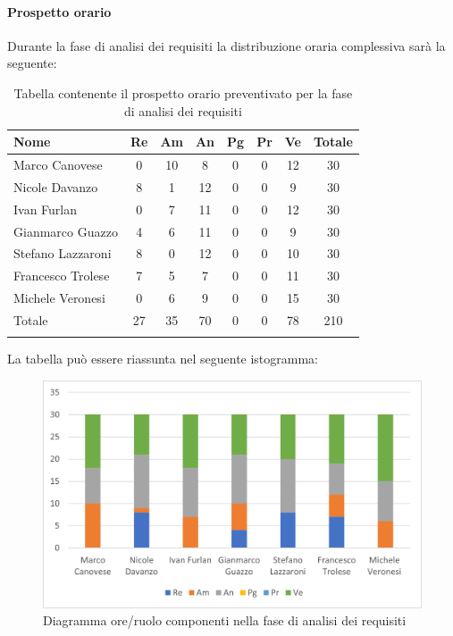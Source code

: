 		\paragraph{Prospetto orario}
			Durante la fase di analisi dei requisiti la distribuzione oraria complessiva sarà la seguente:
			
			\begin{longtable}{|l|c|c|c|c|c|c|c|}
				\hline
				\rowcolor{lighter-grayer}
				\textbf{Nome} & \textbf{Re} & \textbf{Am} & \textbf{An} & \textbf{Pg}  & \textbf{Pr}   & \textbf{Ve} & \textbf{Totale} \\
				\hline
				\endfirsthead
				
				\hline
				Marco Canovese & 0 & 10 & 8 & 0 & 0 & 12 & 30\\
				\hline
				\hline
				Nicole Davanzo & 8 & 1 & 12 & 0 & 0 & 9 & 30\\
				\hline
				\hline
				Ivan Furlan & 0 & 7 & 11 & 0 & 0 & 12 & 30\\
				\hline
				\hline
				Gianmarco Guazzo & 4 & 6 & 11 & 0 & 0 & 9 & 30\\
				\hline
				\hline
				Stefano Lazzaroni & 8 & 0 & 12 & 0 & 0 & 10 & 30\\
				\hline
				\hline
				Francesco Trolese & 7 & 5 & 7 & 0 & 0 & 11 & 30\\
				\hline
				\hline
				Michele Veronesi & 0 & 6 & 9 & 0 & 0 & 15 & 30\\
				\hline 
				\hline
				Totale & 27 & 35 & 70 & 0 & 0 & 78 & 210\\
				\hline
				\rowcolor{white} 
				\caption{Tabella contenente il prospetto orario preventivato per la fase di analisi dei requisiti}
			\end{longtable}

		
			La tabella può essere riassunta nel seguente istogramma:
		
			\begin{figure}[H]
				\centering
				\includegraphics[width=0.8\linewidth]{res/images/preventivo/1-1.png}
				\caption{Diagramma ore/ruolo componenti nella fase di analisi dei requisiti}
				\label{fig:diagramma suddivisione ruoli fase analisi dei requisiti}
			\end{figure}
		
